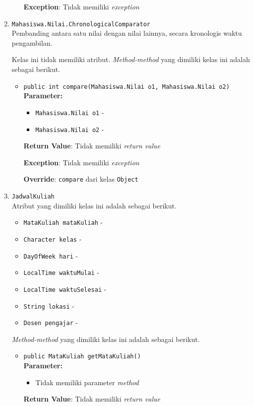 \documentclass{article}
\begin{document}
\begin{enumerate}
\begin{itemize}
\textbf{Exception}: Tidak memiliki \textit{exception}

\end{itemize}
\item \texttt{Mahasiswa.Nilai.ChronologicalComparator}\\ 
Pembanding antara satu nilai dengan nilai lainnya, secara
 kronologis waktu pengambilan.

Kelas ini tidak memiliki atribut. \textit{Method-method} yang dimiliki kelas ini adalah sebagai berikut.
\begin{itemize}
\item \texttt{public int compare(Mahasiswa.Nilai o1, Mahasiswa.Nilai o2)}\\ 


\textbf{Parameter:}\begin{itemize}
\item \texttt{Mahasiswa.Nilai o1} - 
\item \texttt{Mahasiswa.Nilai o2} - 
\end{itemize}
\textbf{Return Value}: Tidak memiliki \textit{return value}

\textbf{Exception}: Tidak memiliki \textit{exception}

\textbf{Override}: \texttt{compare} dari kelas \texttt{Object}

\end{itemize}
\item \texttt{JadwalKuliah}\\ 


Atribut yang dimiliki kelas ini adalah sebagai berikut.
\begin{itemize}
\item \texttt{MataKuliah mataKuliah} - 
\item \texttt{Character kelas} - 
\item \texttt{DayOfWeek hari} - 
\item \texttt{LocalTime waktuMulai} - 
\item \texttt{LocalTime waktuSelesai} - 
\item \texttt{String lokasi} - 
\item \texttt{Dosen pengajar} - 
\end{itemize}
\textit{Method-method} yang dimiliki kelas ini adalah sebagai berikut.
\begin{itemize}
\item \texttt{public MataKuliah getMataKuliah()}\\ 


\textbf{Parameter:}\begin{itemize}
\item Tidak memiliki parameter \textit{method}
\end{itemize}
\textbf{Return Value}: Tidak memiliki \textit{return value}


\end{itemize}
\end{enumerate}
\end{document}
